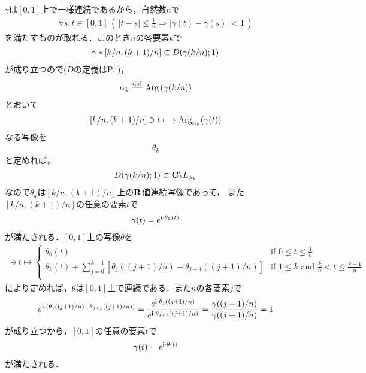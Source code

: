 	\begin{sketch}
		$\gamma$は$[0,1]$上で一様連続であるから，自然数$n$で
		\begin{align}
			\forall s,t \in [0,1]\, \left(\, |t-s| \leq \frac{1}{n} \Longrightarrow |\gamma(t) - \gamma(s)| < 1\, \right)
		\end{align}
		を満たすものが取れる．このとき$n$の各要素$k$で
		\begin{align}
			\gamma \ast \left[k/n,(k+1)/n\right] \subset D(\gamma(k/n);1)
		\end{align}
		が成り立つので($D$の定義はP. \pageref{definition_of_disc_on_plane})，
		\begin{align}
			\alpha_{k} \defeq \pvarg{(\gamma(k/n))}
		\end{align}
		とおいて
		\begin{align}
			\left[k/n,(k+1)/n\right] \ni t \longmapsto \operatorname{Arg}_{\alpha_{k}}(\gamma(t))
		\end{align}
		なる写像を
		\begin{align}
			\theta_{k}
		\end{align}
		と定めれば，
		\begin{align}
			D(\gamma(k/n);1) \subset \mathbf{C} \backslash L_{\alpha_{k}}
		\end{align}
		なので$\theta_{k}$は$\left[k/n,(k+1)/n\right]$上の$\mathbf{R}$値連続写像であって，
		また$\left[k/n,(k+1)/n\right]$の任意の要素$t$で
		\begin{align}
			\gamma(t) = e^{\mathbf{i} \cdot \theta_{k}(t)}
		\end{align}
		が満たされる．$[0,1]$上の写像$\theta$を
		\begin{align}
			[0,1] \ni t \longmapsto
			\begin{cases}
				\theta_{0}(t) & \mbox{if } {\displaystyle 0 \leq t \leq \frac{1}{n}} \\
				{\displaystyle \theta_{k}(t) + \sum_{j=0}^{k-1} \left[\theta_{j}((j+1)/n) - \theta_{j+1}((j+1)/n)\right]}
				& \mbox{if } 1 \leq k \mbox{ and } {\displaystyle \frac{k}{n} < t \leq \frac{k+1}{n}} \\
			\end{cases}
		\end{align}
		により定めれば，$\theta$は$[0,1]$上で連続である．また$n$の各要素$j$で
		\begin{align}
			e^{\mathbf{i} \cdot \left(\theta_{j}((j+1)/n) - \theta_{j+1}((j+1)/n)\right)}
			= \frac{e^{\mathbf{i} \cdot \theta_{j}((j+1)/n)}}{e^{\mathbf{i} \cdot \theta_{j+1}((j+1)/n)}}
			= \frac{\gamma((j+1)/n)}{\gamma((j+1)/n)}
			= 1
		\end{align}
		が成り立つから，$[0,1]$の任意の要素$t$で
		\begin{align}
			\gamma(t) = e^{\mathbf{i} \cdot \theta(t)}
		\end{align}
		が満たされる．
		\QED
	\end{sketch}
	
